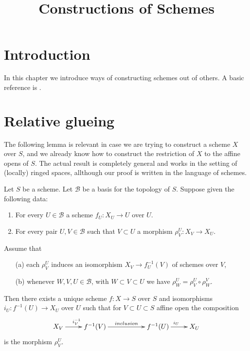 

%


\title{Constructions of Schemes}


\maketitle

\label{section-phantom}

\tableofcontents

\section{Introduction}
\label{section-introduction}

\noindent
In this chapter we introduce ways of constructing schemes out of others.
A basic reference is \cite{EGA}.





\section{Relative glueing}
\label{section-relative-glueing}

\noindent
The following lemma is relevant in case we are trying to construct a
scheme $X$ over $S$, and we already know how to construct the restriction
of $X$ to the affine opens of $S$. The actual result is completely general
and works in the setting of (locally) ringed spaces, allthough our proof
is written in the language of schemes.

\begin{lemma}
\label{lemma-relative-glueing}
Let $S$ be a scheme.
Let $\mathcal{B}$ be a basis for the topology of $S$.
Suppose given the following data:
\begin{enumerate}
\item For every $U \in \mathcal{B}$ a scheme $f_U : X_U \to U$ over $U$.
\item For every pair $U, V \in \mathcal{B}$ such that
$V \subset U$ a morphism $\rho^U_V : X_V \to X_U$.
\end{enumerate}
Assume that
\begin{enumerate}
\item[(a)] each $\rho^U_V$ induces an isomorphism
$X_V \to f_U^{-1}(V)$ of schemes over $V$,
\item[(b)] whenever $W, V, U \in \mathcal{B}$, with
$W \subset V \subset U$ we have $\rho^U_W = \rho^U_V \circ \rho ^V_W$.
\end{enumerate}
Then there exists a unique scheme $f : X \to S$ over $S$
and isomorphisms $i_U : f^{-1}(U) \to X_U$ over $U$ such that
for $V \subset U \subset S$ affine open the composition
$$
\xymatrix{
X_V \ar[r]^{i_V^{-1}} &
f^{-1}(V) \ar[rr]^{inclusion} & &
f^{-1}(U) \ar[r]^{i_{U}} &
X_U
}
$$
is the morphism $\rho^U_V$.
\end{lemma}

